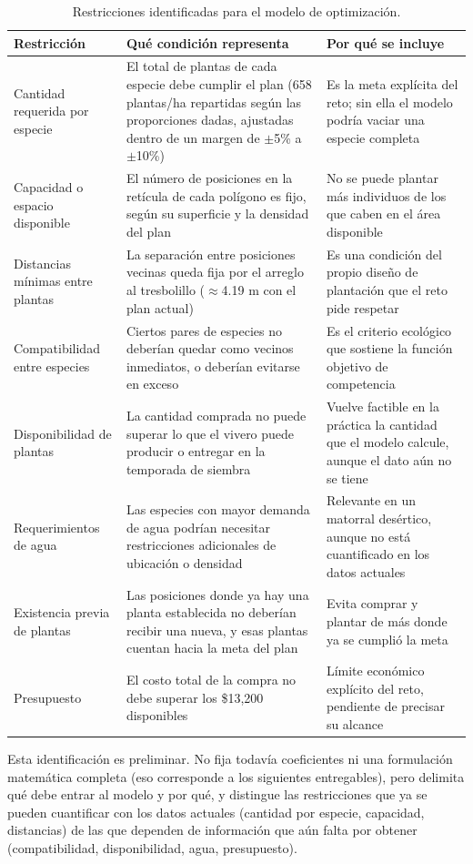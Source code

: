 \begin{table}[t]
\centering
\caption{Restricciones identificadas para el modelo de optimización.}
\label{tab:restricciones}
\small
\begin{tabular}{@{}p{}p{}p{}@{}}
\toprule
Restricción & Qué condición representa & Por qué se incluye \\
\midrule
Cantidad requerida por especie & El total de plantas de cada especie debe cumplir el plan (658 plantas/ha repartidas según las proporciones dadas, ajustadas dentro de un margen de $\pm$5\% a $\pm$10\%) & Es la meta explícita del reto; sin ella el modelo podría vaciar una especie completa \\
Capacidad o espacio disponible & El número de posiciones en la retícula de cada polígono es fijo, según su superficie y la densidad del plan & No se puede plantar más individuos de los que caben en el área disponible \\
Distancias mínimas entre plantas & La separación entre posiciones vecinas queda fija por el arreglo al tresbolillo ($\approx$4.19 m con el plan actual) & Es una condición del propio diseño de plantación que el reto pide respetar \\
Compatibilidad entre especies & Ciertos pares de especies no deberían quedar como vecinos inmediatos, o deberían evitarse en exceso & Es el criterio ecológico que sostiene la función objetivo de competencia \\
Disponibilidad de plantas & La cantidad comprada no puede superar lo que el vivero puede producir o entregar en la temporada de siembra & Vuelve factible en la práctica la cantidad que el modelo calcule, aunque el dato aún no se tiene \\
Requerimientos de agua & Las especies con mayor demanda de agua podrían necesitar restricciones adicionales de ubicación o densidad & Relevante en un matorral desértico, aunque no está cuantificado en los datos actuales \\
Existencia previa de plantas & Las posiciones donde ya hay una planta establecida no deberían recibir una nueva, y esas plantas cuentan hacia la meta del plan & Evita comprar y plantar de más donde ya se cumplió la meta \\
Presupuesto & El costo total de la compra no debe superar los \$13{,}200 disponibles & Límite económico explícito del reto, pendiente de precisar su alcance \\
\bottomrule
\end{tabular}
\end{table}

Esta identificación es preliminar. No fija todavía coeficientes ni una formulación matemática completa (eso corresponde a los siguientes entregables), pero delimita qué debe entrar al modelo y por qué, y distingue las restricciones que ya se pueden cuantificar con los datos actuales (cantidad por especie, capacidad, distancias) de las que dependen de información que aún falta por obtener (compatibilidad, disponibilidad, agua, presupuesto).

